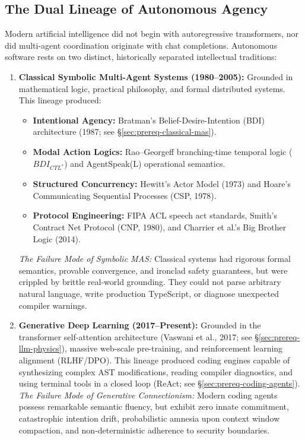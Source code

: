 \documentclass[11pt,a4paper]{article}
\begin{document}
\subsection{The Dual Lineage of Autonomous Agency}\label{sec:prereq-lineage}

Modern artificial intelligence did not begin with autoregressive transformers, nor did multi-agent coordination originate with chat completions. Autonomous software rests on two distinct, historically separated intellectual traditions:

\begin{enumerate}[leftmargin=1.8em,itemsep=3pt]
  \item \textbf{Classical Symbolic Multi-Agent Systems (1980--2005):} Grounded in mathematical logic, practical philosophy, and formal distributed systems. This lineage produced:
  \begin{itemize}[itemsep=1.5pt]
    \item \textbf{Intentional Agency:} Bratman's Belief-Desire-Intention (BDI) architecture (1987; see \S\ref{sec:prereq-classical-mas}).
    \item \textbf{Modal Action Logics:} Rao--Georgeff branching-time temporal logic ($BDI_{CTL^*}$) and AgentSpeak(L) operational semantics.
    \item \textbf{Structured Concurrency:} Hewitt's Actor Model (1973) and Hoare's Communicating Sequential Processes (CSP, 1978).
    \item \textbf{Protocol Engineering:} FIPA ACL speech act standards, Smith's Contract Net Protocol (CNP, 1980), and Charrier et al.'s Big Brother Logic (2014).
  \end{itemize}
  \emph{The Failure Mode of Symbolic MAS:} Classical systems had rigorous formal semantics, provable convergence, and ironclad safety guarantees, but were crippled by brittle real-world grounding. They could not parse arbitrary natural language, write production TypeScript, or diagnose unexpected compiler warnings.

  \item \textbf{Generative Deep Learning (2017--Present):} Grounded in the transformer self-attention architecture (Vaswani et al., 2017; see \S\ref{sec:prereq-llm-physics}), massive web-scale pre-training, and reinforcement learning alignment (RLHF/DPO). This lineage produced coding engines capable of synthesizing complex AST modifications, reading compiler diagnostics, and using terminal tools in a closed loop (ReAct; see \S\ref{sec:prereq-coding-agents}).
  \emph{The Failure Mode of Generative Connectionism:} Modern coding agents possess remarkable semantic fluency, but exhibit zero innate commitment, catastrophic intention drift, probabilistic amnesia upon context window compaction, and non-deterministic adherence to security boundaries.
\end{enumerate}
\end{document}
